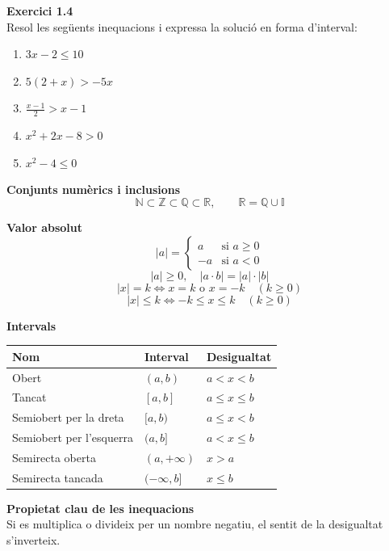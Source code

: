 \documentclass[12pt]{article}
\begin{document}
\begin{exercici}
\textbf{Exercici 1.4}\\
Resol les següents inequacions i expressa la solució en forma d'interval:
\begin{enumerate}[label=\alph*)]
    \item $3x - 2 \le 10$
    \item $5(2 + x) > -5x$
    \item $\frac{x - 1}{2} > x - 1$
    \item $x^2 + 2x - 8 > 0$
    \item $x^2 - 4 \le 0$
\end{enumerate}
\end{exercici}

\begin{resum}[title=Resum del Tema 1: Nombres Reals]
\textbf{Conjunts numèrics i inclusions}
\[
\mathbb{N} \subset \mathbb{Z} \subset \mathbb{Q} \subset \mathbb{R}, \qquad \mathbb{R} = \mathbb{Q} \cup \mathbb{I}
\]

\textbf{Valor absolut}
\[
|a| = \begin{cases} a & \text{si } a \ge 0 \\ -a & \text{si } a < 0 \end{cases}
\]
\[
|a| \ge 0, \quad |a \cdot b| = |a| \cdot |b|
\]
\[
|x| = k \iff x = k \text{ o } x = -k \quad (k \ge 0)
\]
\[
|x| \le k \iff -k \le x \le k \quad (k \ge 0)
\]

\textbf{Intervals}
\begin{center}
\small
\begin{tabular}{lll}
\toprule
\textbf{Nom} & \textbf{Interval} & \textbf{Desigualtat} \\
\midrule
Obert & $(a,b)$ & $a < x < b$ \\
Tancat & $[a,b]$ & $a \le x \le b$ \\
Semiobert per la dreta & $[a,b)$ & $a \le x < b$ \\
Semiobert per l'esquerra & $(a,b]$ & $a < x \le b$ \\
Semirecta oberta & $(a,+\infty)$ & $x > a$ \\
Semirecta tancada & $(-\infty,b]$ & $x \le b$ \\
\bottomrule
\end{tabular}
\end{center}

\textbf{Propietat clau de les inequacions}\\
Si es multiplica o divideix per un nombre negatiu, el sentit de la desigualtat s'inverteix.
\end{resum}
\end{document}
